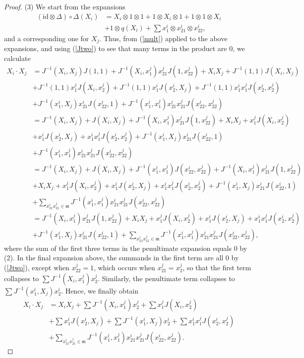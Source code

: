 \documentclass{amsart}
\numberwithin{equation}{section}
\theoremstyle{definition}
\begin{document}
\begin{proof}
(3) We start from the expansions
\begin{align*} 
(\mathrm{id}\otimes \Delta)\circ\Delta (X_i) &= X_i \otimes 1 \otimes 1 + 1 \otimes X_i \otimes 1 + 1 \otimes 1 \otimes X_i\\
&  + 1 \otimes q(X_i) + \sum x^i_1 \otimes x^i_{21} \otimes x^i_{22},
\end{align*}
and a corresponding one for $X_j$. 
Thus, from (\ref{mult}) applied to the above expansions, and using (\ref{Jtwo}) to see that many terms in the product are $0$, we calculate
\begin{align*} 
X_i \cdot X_j &= J^{-1}(X_i,X_j)J(1,1) +J^{-1}(X_i,x^j_1)x^j_{21}J(1,x^j_{22})+ X_iX_j + J^{-1}(1,1)J(X_i,X_j)\\
&+J^{-1}(1,1)x^j_1 J(X_i,x^j_2)+ J^{-1}(1,1)x^i_1J(x^i_2,X_j)+ J^{-1}(1,1)x^i_1x^j_1J(x^i_2,x^j_2)\\ 
&+ J^{-1}(x^i_1,X_j)x^i_{21}J(x^i_{22},1) + J^{-1}(x^i_1,x^j_1)x^i_{21}x^j_{21}J(x^i_{22},x^j_{22})\\
&= J^{-1}(X_i, X_j) + J(X_i,X_j) + J^{-1}(X_i, x^j_1)x^j_{21}J(1,x^j_{22})+ X_iX_j + x^j_1J(X_i,x^j_2)\\
& + x^i_1 J(x^i_2,X_j)+ x^i_1x^j_1J(x^i_2,x^j_2) + J^{-1}(x^i_1,X_j)x^i_{21}J(x^i_{22},1)\\
&+ J^{-1}(x^i_1,x^j_1)x^i_{21}x^j_{21}J(x^i_{22},x^j_{22})\\
&= J^{-1}(X_i, X_j) + J(X_i,X_j) + J^{-1}(x^i_1,x^j_1)J(x^i_{22},x^j_{22})+ J^{-1}(X_i, x^j_1)x^j_{21}J(1,x^j_{22})\\
& + X_iX_j + x^j_1J(X_i,x^j_2) + x^i_1 J(x^i_2,X_j)+ x^i_1x^j_1J(x^i_2,x^j_2) + J^{-1}(x^i_1,X_j)x^i_{21}J(x^i_{22},1)\\
&+ \sum_{x^i_{21}x^j_{21} \in \mathfrak{m}} J^{-1}(x^i_1,x^j_1)x^i_{21}x^j_{21}J(x^i_{22},x^j_{22})\\
&= J^{-1}(X_i, x^j_1)x^j_{21}J(1,x^j_{22})+ X_iX_j + x^j_1J(X_i,x^j_2) + x^i_1 J(x^i_2,X_j)+ x^i_1x^j_1J(x^i_2,x^j_2) \\
&+ J^{-1}(x^i_1,X_j)x^i_{21}J(x^i_{22},1)+ \sum_{x^i_{21}x^j_{21} \in \mathfrak{m}} J^{-1}(x^i_1,x^j_1)x^i_{21}x^j_{21}J(x^i_{22},x^j_{22}),
\end{align*} 
where the sum of the first three terms in the penultimate expansion equals $0$ by (2). In the final expansion above, the summands in the first term are all 0 by (\ref{Jtwo}), except when $x^j_{22} = 1$, which occurs when $x^j_{21} = x^j_2$, so that the first term collapses to $\sum J^{-1}(X_i, x^j_1)x^j_2$. Similarly, the penultimate term collapses to $\sum J^{-1}(x^i_1, X_j)x^i_2$. 
Hence, we finally obtain 
\begin{align*}
X_i \cdot X_j &= X_iX_j + \sum J^{-1}(X_i, x^j_1)x^j_2 + \sum x^j_1J(X_i, x^j_2)\\
& +\sum x^i_1 J(x^i_2, X_j) + \sum J^{-1}(x^i_1,X_j)x^i_2 + \sum x^i_1 x^j_1J(x^i_2,x^j_2)\\
&+ \sum_{x^i_{21}x^j_{21} \in \mathfrak{m}} J^{-1}(x^i_1,x^j_1)x^i_{21}x^j_{21}J(x^i_{22},x^j_{22}).
\end{align*}


\end{proof}
\end{document}
